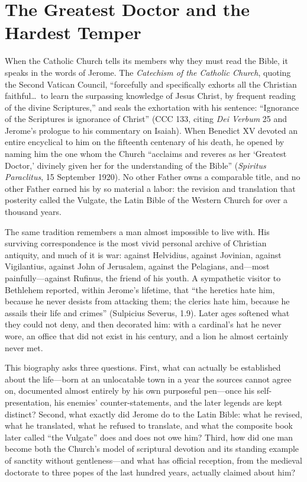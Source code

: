 \section{The Greatest Doctor and the Hardest Temper}

When the Catholic Church tells its members why they must read the Bible, it
speaks in the words of Jerome. The \textit{Catechism of the Catholic Church},
quoting the Second Vatican Council, ``forcefully and specifically exhorts all
the Christian faithful\ldots\ to learn the surpassing knowledge of Jesus
Christ, by frequent reading of the divine Scriptures,'' and seals the
exhortation with his sentence: ``Ignorance of the Scriptures is ignorance of
Christ'' (CCC 133, citing \textit{Dei Verbum} 25 and Jerome's prologue to his
commentary on Isaiah). When Benedict XV devoted an entire encyclical to him on
the fifteenth centenary of his death, he opened by naming him the one whom the
Church ``acclaims and reveres as her `Greatest Doctor,' divinely given her for
the understanding of the Bible'' (\textit{Spiritus Paraclitus}, 15 September
1920). No other Father owns a comparable title, and no other Father earned his
by so material a labor: the revision and translation that posterity called the
Vulgate, the Latin Bible of the Western Church for over a thousand years.

The same tradition remembers a man almost impossible to live with. His
surviving correspondence is the most vivid personal archive of Christian
antiquity, and much of it is war: against Helvidius, against Jovinian, against
Vigilantius, against John of Jerusalem, against the Pelagians, and---most
painfully---against Rufinus, the friend of his youth. A sympathetic visitor to
Bethlehem reported, within Jerome's lifetime, that ``the heretics hate him,
because he never desists from attacking them; the clerics hate him, because he
assails their life and crimes'' (Sulpicius Severus,  1.9). Later
ages softened what they could not deny, and then decorated him: with a
cardinal's hat he never wore, an office that did not exist in his century, and
a lion he almost certainly never met.

This biography asks three questions. First, what can actually be established
about the life---born at an unlocatable town in a year the sources cannot
agree on, documented almost entirely by his own purposeful pen---once his
self-presentation, his enemies' counter-statements, and the later legends are
kept distinct? Second, what exactly did Jerome do to the Latin Bible: what he
revised, what he translated, what he refused to translate, and what the
composite book later called ``the Vulgate'' does and does not owe him? Third,
how did one man become both the Church's model of scriptural devotion and its
standing example of sanctity without gentleness---and what has official
reception, from the medieval doctorate to three popes of the last hundred
years, actually claimed about him?

